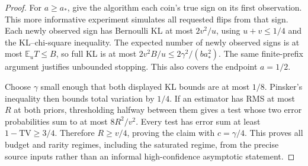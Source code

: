 \documentclass[11pt]{article}
\newcommand{\E}{\mathbb E}
\begin{document}
\begin{proof}
For $a\ge a_*$, give the algorithm each coin's true sign on its first
observation. This more informative experiment simulates all requested flips
from that sign. Each newly observed sign has Bernoulli KL at most $2v^2/u$,
using $u+v\le1/4$ and the KL--chi-square inequality. The expected number of
newly observed signs is at most $\E_u T\le B$, so full KL is at most
$2v^2B/u\le2\gamma^2/(ba_*^2)$. The same finite-prefix argument justifies
unbounded stopping. This also covers the endpoint $a=1/2$.

Choose $\gamma$ small enough that both displayed KL bounds are at most $1/8$.
Pinsker's inequality then bounds total variation by $1/4$. If an estimator has
RMS at most $R$ at both priors, thresholding halfway between them gives a test
whose two error probabilities sum to at most $8R^2/v^2$. Every test has error
sum at least $1-\mathrm{TV}\ge3/4$. Therefore $R\ge v/4$, proving the claim
with $c=\gamma/4$. This proves all budget and rarity regimes, including the
saturated regime, from the precise source inputs rather than an informal
high-confidence asymptotic statement.
\end{proof}
\end{document}
